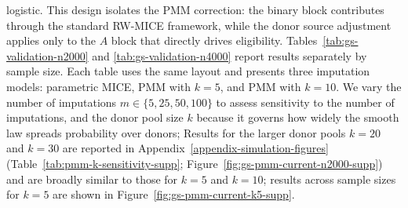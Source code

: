 logistic. This design isolates the PMM correction: the binary block
contributes through the standard RW-MICE framework, while the donor source
adjustment applies only to the \(A\) block that directly drives eligibility.
Tables~\ref{tab:gs-validation-n2000} and
\ref{tab:gs-validation-n4000} report results separately by sample size.
Each table uses the same layout and presents three imputation models:
parametric MICE, PMM with \(k=5\), and PMM with \(k=10\).  We vary the
number of imputations \(m\in\{5,25,50,100\}\) to assess sensitivity to
the number of imputations, and the donor pool size \(k\) because it
governs how widely the smooth law spreads probability over donors;
Results for the larger donor pools \(k=20\) and \(k=30\) are reported
in Appendix~\ref{appendix-simulation-figures}
(Table~\ref{tab:pmm-k-sensitivity-supp};
Figure~\ref{fig:gs-pmm-current-n2000-supp}) and are broadly similar to
those for \(k=5\) and \(k=10\); results across sample sizes for
\(k=5\) are shown in Figure~\ref{fig:gs-pmm-current-k5-supp}.

